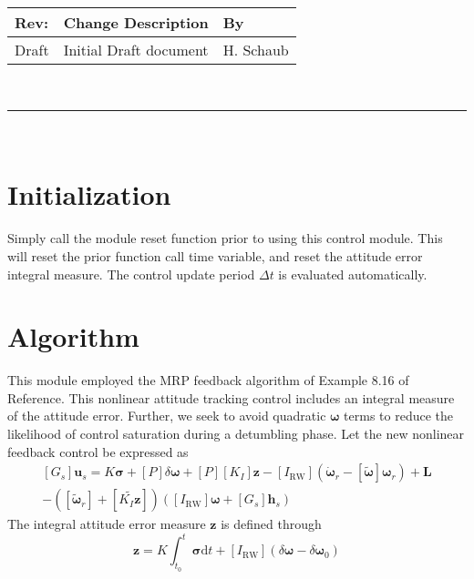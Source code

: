 \documentclass[]{BasiliskReportMemo}
\begin{document}
\makeCover


%
%
\pagestyle{empty}
{\renewcommand{\arraystretch}{2}
\noindent
\begin{longtable}{|p{0.5in}|p{4.5in}|p{1.14in}|}
\hline
{\bfseries Rev}: & {\bfseries Change Description} & {\bfseries By} \\
\hline
Draft & Initial Draft document & H. Schaub \\
\hline

\end{longtable}
}

\newpage
\setcounter{page}{1}
\pagestyle{fancy}

\tableofcontents
~\\ \hrule ~\\


\section{Initialization}
Simply call the module reset function prior to using this control module.  This will reset the prior function call time variable, and reset the attitude error integral measure.  The control update period $\Delta t$ is evaluated automatically.  

\section{Algorithm}
		 This module employed the MRP feedback algorithm of Example 8.16 of Reference.  This  nonlinear attitude tracking control includes an integral measure of the attitude error.  Further, we seek to avoid quadratic $\bm\omega$ terms to reduce the likelihood of control saturation during a detumbling phase.  Let the new nonlinear feedback control be expressed as
		\begin{multline}
			\label{eq:GusRW}
			[G_{s}]\bm u_{s} = K \bm\sigma + [P] \delta\bm\omega + [P][K_{I}] \bm z - [I_{\text{RW}}](\dot{\bm\omega}_{r} - [\tilde{\bm\omega}]\bm\omega_{r}) + \bm L
			\\
			- ([\tilde{\bm \omega}_{r}] + [\widetilde{K_{I}\bm z}])
			\left([I_{\text{RW}}]\bm\omega + [G_{s}]\bm h_{s} \right)
		\end{multline}
		The integral attitude error measure $\bm z$ is defined through
		\begin{equation*}
			\bm z = K \int_{t_{0}}^{t} \bm\sigma \text{d}t + [I_{\text{RW}}](\delta\bm\omega - \delta\bm\omega_{0})
		\end{equation*}
		
\end{document}
